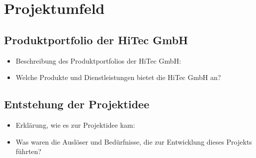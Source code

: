
\section{Projektumfeld}\label{projektumfeld}

\subsection{Produktportfolio der HiTec GmbH}\label{produktportfolio-der-hitec-gmbh}

\begin{itemize}
\item
  Beschreibung des Produktportfolios der HiTec GmbH:
\item
  Welche Produkte und Dienstleistungen bietet die HiTec GmbH an?
\end{itemize}

\subsection{Entstehung der Projektidee}\label{entstehung-der-projektidee}

\begin{itemize}
\item
  Erklärung, wie es zur Projektidee kam:
\item
  Was waren die Auslöser und Bedürfnisse, die zur Entwicklung dieses Projekts führten?
\end{itemize}